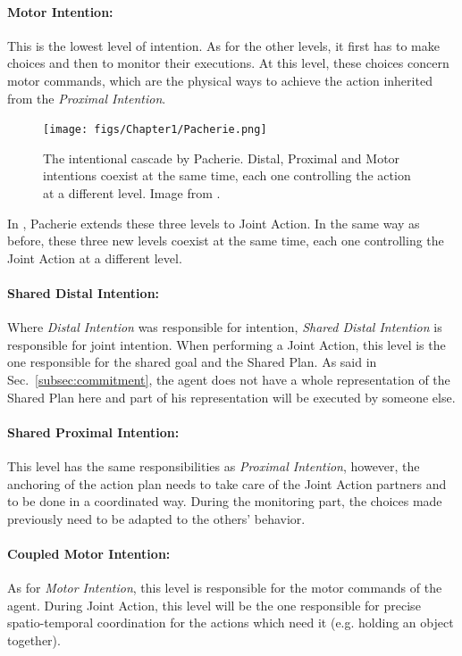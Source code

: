 \documentclass[english,a4paper,11pt,twoside]{StyleThese}
\begin{document}
\paragraph{Motor Intention:}
This is the lowest level of intention. As for the other levels, it first has to make choices and then to monitor their executions. At this level, these choices concern motor commands, which are the physical ways to achieve the action inherited from the \textit{Proximal Intention}.


\begin{figure}[!h]
	\centering
    \texttt{[image: figs/Chapter1/Pacherie.png]}
    \caption{The intentional cascade by Pacherie. Distal, Proximal and Motor intentions coexist at the same time, each one controlling the action at a different level. Image from \cite{pacherie2008phenomenology}.}
    \label{fig:Pacherie}
\end{figure}

\bigskip
In \cite{pacherie2011phenomenology}, Pacherie extends these three levels to Joint Action. In the same way as before, these three new levels coexist at the same time, each one controlling the Joint Action at a different level.

\paragraph{Shared Distal Intention:}
Where \textit{Distal Intention} was responsible for intention, \textit{Shared Distal Intention} is responsible for joint intention. When performing a Joint Action, this level is the one responsible for the shared goal and the Shared Plan. As said in Sec.~\ref{subsec:commitment}, the agent does not have a whole representation of the Shared Plan here and part of his representation will be executed by someone else.

\paragraph{Shared Proximal Intention:}
This level has the same responsibilities as \textit{Proximal Intention}, however, the anchoring of the action plan needs to take care of the Joint Action partners and to be done in a coordinated way. During the monitoring part, the choices made previously need to be adapted to the others' behavior.

\paragraph{Coupled Motor Intention:}
As for \textit{Motor Intention}, this level is responsible for the motor commands of the agent. During Joint Action, this level will be the one responsible for precise spatio-temporal coordination for the actions which need it (e.g. holding an object together).
\end{document}
